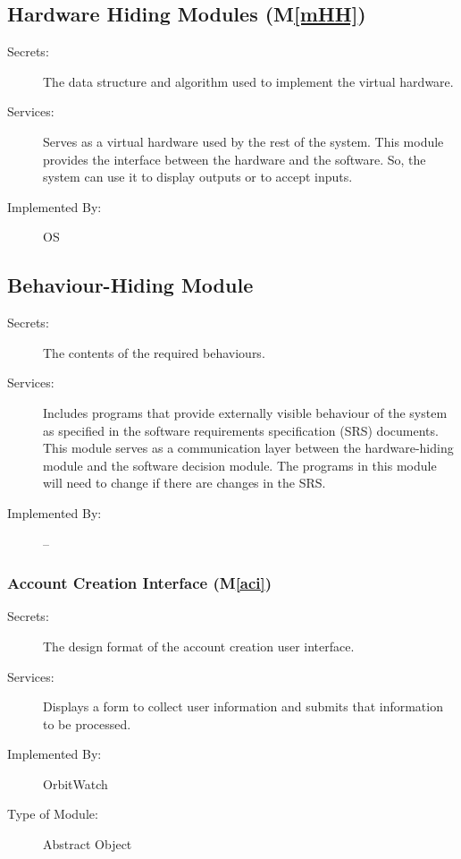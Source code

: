 \documentclass[12pt, titlepage]{article}
\newcommand{\mref}[1]{M\ref{#1}}
\begin{document}
\subsection{Hardware Hiding Modules (\mref{mHH})}

\begin{description}
\item[Secrets:]The data structure and algorithm used to implement the virtual
  hardware.
\item[Services:]Serves as a virtual hardware used by the rest of the
  system. This module provides the interface between the hardware and the
  software. So, the system can use it to display outputs or to accept inputs.
\item[Implemented By:] OS
\end{description}

\subsection{Behaviour-Hiding Module}

\begin{description}
\item[Secrets:]The contents of the required behaviours.
\item[Services:]Includes programs that provide externally visible behaviour of
  the system as specified in the software requirements specification (SRS)
  documents. This module serves as a communication layer between the
  hardware-hiding module and the software decision module. The programs in this
  module will need to change if there are changes in the SRS.
\item[Implemented By:] --
\end{description}

\subsubsection{Account Creation Interface (\mref{aci})}

\begin{description}
\item[Secrets:]The design format of the account creation user interface.
\item[Services:] Displays a form to collect user information and submits that information to be processed.
\item[Implemented By:] OrbitWatch
\item[Type of Module:] Abstract Object
\end{description}
\end{document}
